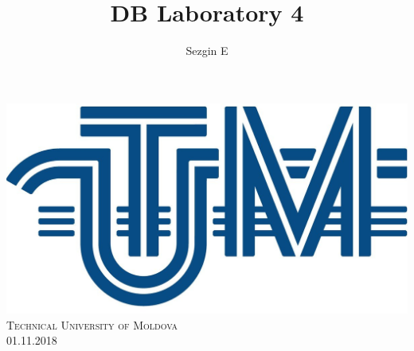 \documentclass[12pt]{article}
\title{DB Laboratory 4}
\author{Sezgin E}
\begin{document}
        
        
        \begin{titlepage}
                \centering
                \vspace*{0.5 cm}
                \includegraphics[scale = 0.11]{LOGO_UTM.jpg}\\[1.0 cm]	%
                \textsc{\LARGE Technical University of Moldova}\\[2.0 cm]%
                \textsc{\Large 01.11.2018}\\[0.5 cm]		%


\end{titlepage}
\end{document}
